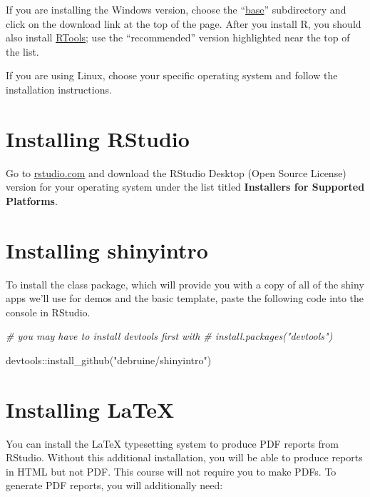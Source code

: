 \documentclass[
]{book}
\newenvironment{Shaded}{\begin{snugshade}}{\end{snugshade}}
\newcommand{\CommentTok}[1]{\textcolor[rgb]{0.56,0.35,0.01}{\textit{#1}}}
\newcommand{\FunctionTok}[1]{\textcolor[rgb]{0.00,0.00,0.00}{#1}}
\newcommand{\NormalTok}[1]{#1}
\newcommand{\SpecialCharTok}[1]{\textcolor[rgb]{0.00,0.00,0.00}{#1}}
\newcommand{\StringTok}[1]{\textcolor[rgb]{0.31,0.60,0.02}{#1}}
\begin{document}
If you are installing the Windows version, choose the ``\href{https://cran.rstudio.com/bin/windows/base/}{base}'' subdirectory and click on the download link at the top of the page. After you install R, you should also install \href{https://cran.rstudio.com/bin/windows/Rtools/}{RTools}; use the ``recommended'' version highlighted near the top of the list.

If you are using Linux, choose your specific operating system and follow the installation instructions.

\hypertarget{installing-rstudio}{%
\section{Installing RStudio}\label{installing-rstudio}}

Go to \href{https://www.rstudio.com/products/rstudio/download/\#download}{rstudio.com} and download the RStudio Desktop (Open Source License) version for your operating system under the list titled \textbf{Installers for Supported Platforms}.

\hypertarget{installing-shinyintro-1}{%
\section{Installing shinyintro}\label{installing-shinyintro-1}}

To install the class package, which will provide you with a copy of all of the shiny apps we'll use for demos and the basic template, paste the following code into the console in RStudio.

\begin{Shaded}
\begin{Highlighting}[]
\CommentTok{\# you may have to install devtools first with }
\CommentTok{\# install.packages("devtools")}

\NormalTok{devtools}\SpecialCharTok{::}\FunctionTok{install\_github}\NormalTok{(}\StringTok{"debruine/shinyintro"}\NormalTok{)}
\end{Highlighting}
\end{Shaded}

\hypertarget{installing-latex}{%
\section{Installing LaTeX}\label{installing-latex}}

You can install the LaTeX typesetting system to produce PDF reports from RStudio. Without this additional installation, you will be able to produce reports in HTML but not PDF. This course will not require you to make PDFs. To generate PDF reports, you will additionally need:
\end{document}
